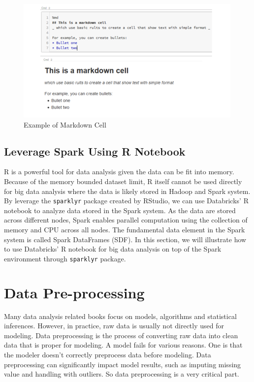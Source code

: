\documentclass[12pt,]{krantz}
\begin{document}
\begin{figure}

{\centering \includegraphics[width=0.8\linewidth]{images/dbxmarkdown} 

}

\caption{Example of Markdown Cell}\label{fig:dbxmarkdown}
\end{figure}

\hypertarget{leverage-spark-using-r-notebook}{%
\section{Leverage Spark Using R Notebook}\label{leverage-spark-using-r-notebook}}

R is a powerful tool for data analysis given the data can be fit into memory. Because of the memory bounded dataset limit, R itself cannot be used directly for big data analysis where the data is likely stored in Hadoop and Spark system. By leverage the \texttt{sparklyr} package created by RStudio, we can use Databricks' R notebook to analyze data stored in the Spark system. As the data are stored across different nodes, Spark enables parallel computation using the collection of memory and CPU across all nodes. The fundamental data element in the Spark system is called Spark DataFrames (SDF). In this section, we will illustrate how to use Databricks' R notebook for big data analysis on top of the Spark environment through \texttt{sparklyr} package.

\hypertarget{data-pre-processing}{%
\chapter{Data Pre-processing}\label{data-pre-processing}}

Many data analysis related books focus on models, algorithms and statistical inferences. However, in practice, raw data is usually not directly used for modeling. Data preprocessing is the process of converting raw data into clean data that is proper for modeling. A model fails for various reasons. One is that the modeler doesn't correctly preprocess data before modeling. Data preprocessing can significantly impact model results, such as imputing missing value and handling with outliers. So data preprocessing is a very critical part.
\end{document}
